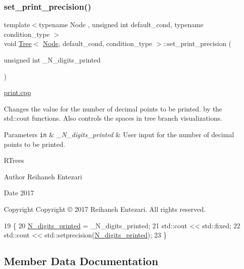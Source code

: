 \subsubsection{\texorpdfstring{set\+\_\+print\+\_\+precision()}{set\_print\_precision()}}
{\footnotesize\ttfamily template$<$typename Node , unsigned int default\+\_\+cond, typename condition\+\_\+type $>$ \\
void \hyperlink{class_tree}{Tree}$<$ \hyperlink{struct_node}{Node}, default\+\_\+cond, condition\+\_\+type $>$\+::set\+\_\+print\+\_\+precision (\begin{DoxyParamCaption}\item[{unsigned int}]{\+\_\+\+N\+\_\+digits\+\_\+printed }\end{DoxyParamCaption})}



\hyperlink{print_8cpp}{print.\+cpp} 

Changes the value for the number of decimal points to be printed. by the std\+::cout functions. Also controls the spaces in tree branch visualizations. 
\begin{DoxyParams}[1]{Parameters}
\mbox{\tt in}  & {\em \+\_\+\+N\+\_\+digits\+\_\+printed} & User input for the number of decimal points to be printed.\\
\hline
\end{DoxyParams}
R\+Trees \begin{DoxyAuthor}{Author}
Reihaneh Entezari 
\end{DoxyAuthor}
\begin{DoxyDate}{Date}
2017 
\end{DoxyDate}
\begin{DoxyCopyright}{Copyright}
Copyright © 2017 Reihaneh Entezari. All rights reserved. 
\end{DoxyCopyright}

\begin{DoxyCode}
19 \{
20     \hyperlink{class_tree_ad24ef7cae6a7c0226280cf56bbc25f53}{N\_digits\_printed} = \_N\_digits\_printed;
21     std::cout << std::fixed;
22     std::cout << std::setprecision(\hyperlink{class_tree_ad24ef7cae6a7c0226280cf56bbc25f53}{N\_digits\_printed});
23 \}
\end{DoxyCode}


\subsection{Member Data Documentation}
\mbox{\label{class_tree_ad24ef7cae6a7c0226280cf56bbc25f53}} 
